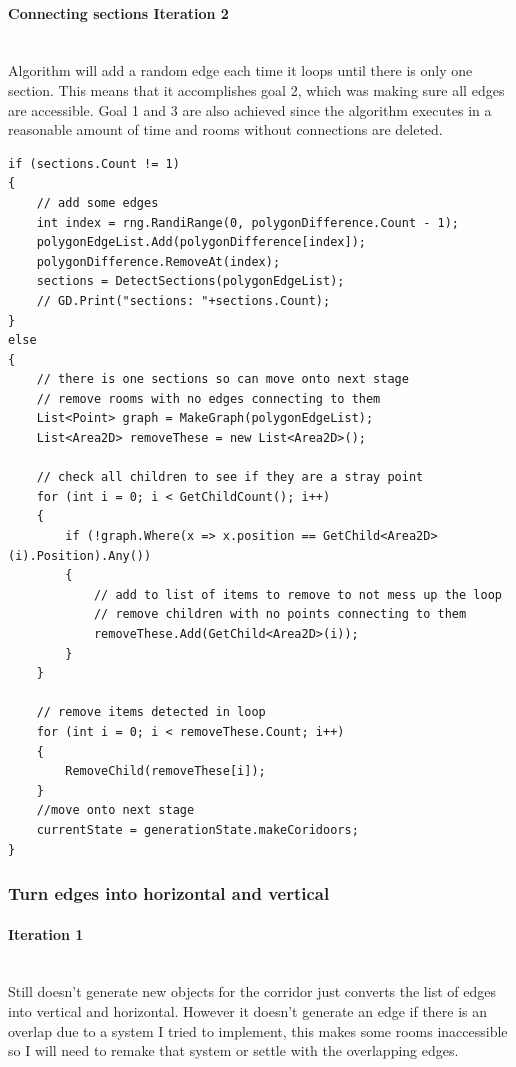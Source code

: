 \documentclass{article}
\newcommand{\parBr}{\vspace{5mm}}%
\newcommand{\myparagraph}[1]{\paragraph{#1}\mbox{}\\} %
\begin{document}
\myparagraph{Connecting sections Iteration 2}
Algorithm will add a random edge each time it loops until there is only one section. This means that it accomplishes goal 2, which was making sure all edges are accessible. Goal 1 and 3 are also achieved since the algorithm executes in a reasonable amount of time and rooms without connections are deleted.
\begin{lstlisting}
if (sections.Count != 1)
{
    // add some edges
    int index = rng.RandiRange(0, polygonDifference.Count - 1);
    polygonEdgeList.Add(polygonDifference[index]);
    polygonDifference.RemoveAt(index);
    sections = DetectSections(polygonEdgeList);
    // GD.Print("sections: "+sections.Count);
}
else
{
	// there is one sections so can move onto next stage
    // remove rooms with no edges connecting to them
    List<Point> graph = MakeGraph(polygonEdgeList);
    List<Area2D> removeThese = new List<Area2D>();

    // check all children to see if they are a stray point
    for (int i = 0; i < GetChildCount(); i++)
    {
        if (!graph.Where(x => x.position == GetChild<Area2D>(i).Position).Any())
        {
            // add to list of items to remove to not mess up the loop
            // remove children with no points connecting to them
            removeThese.Add(GetChild<Area2D>(i));
        }
    }

    // remove items detected in loop
    for (int i = 0; i < removeThese.Count; i++)
    {
        RemoveChild(removeThese[i]);
    }
	//move onto next stage
    currentState = generationState.makeCoridoors;
}
\end{lstlisting}

\subsubsection{Turn edges into horizontal and vertical}
\myparagraph{Iteration 1}
Still doesn't generate new objects for the corridor just converts the list of edges into vertical and horizontal. However it doesn't generate an edge if there is an overlap due to a system I tried to implement, this makes some rooms inaccessible so I will need to remake that system or settle with the overlapping edges.

\parBr
\end{document}
